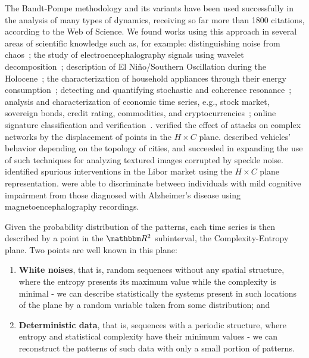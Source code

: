 The Bandt-Pompe methodology and its variants have been used successfully in the analysis of many types of dynamics, receiving so far more than \num{1800} citations, according to the Web of Science.
We found works using this approach in several areas of scientific knowledge such as, for example:
distinguishing noise from chaos~\citep{rosso2007distinguishing};
the study of electroencephalography signals using wavelet decomposition~\citep{baravalle2018discriminating,baravalle2018rhythmic};
description of El Niño/Southern Oscillation during the Holocene~\citep{saco2010entropy};
the characterization of household appliances through their energy consumption~\citep{CharacterizationElectricLoadInformationTheoryQuantifiers};
detecting and quantifying stochastic and coherence resonance~\citep{rosso2009detectinga, rosso2009detectingb};
analysis and characterization of economic time series, e.g., stock market, sovereign bonds, credit rating, commodities, and cryptocurrencies~\citep{zunino2010complexity, zunino2012efficiency, bariviera2013efficiency, bariviera2018analysis, Araujo2019permutation};
online signature classification and verification~\citep{ClassificationVerificationOnlineHandwrittenSignatures}.
\citet{InformationTheoryPerspectiveNetworkRobustness} verified the effect of attacks on complex networks by the displacement of points in the $H \times C$ plane.
\citet{CharacterizationVehicleBehaviorInformationTheory} described vehicles' behavior depending on the topology of cities, and
\citet{Chagas2020Characterization} succeeded in expanding the use of such techniques for analyzing textured images corrupted by speckle noise.
\citet{LiborInvisibleHand} identified spurious interventions in the Libor market using the $H\times C$ plane representation.
\citet{echegoyen2020permutation} were able to discriminate between individuals with mild cognitive impairment from those diagnosed with Alzheimer's disease using magnetoencephalography recordings.

Given the probability distribution of the patterns, each time series is then described by a point in the $\mathbbm R^2$ subinterval, the Complexity-Entropy plane.
Two points are well known in this plane:
\begin{enumerate}
    \item \textbf{White noises}, that is, random sequences without any spatial structure, where the entropy presents its maximum value while the complexity is minimal - we can describe statistically the systems present in such locations of the plane by a random variable taken from some distribution; and
    \item \textbf{Deterministic data}, that is, sequences with a periodic structure, where entropy and statistical complexity have their minimum values - we can reconstruct the patterns of such data with only a small portion of patterns.
\end{enumerate}

